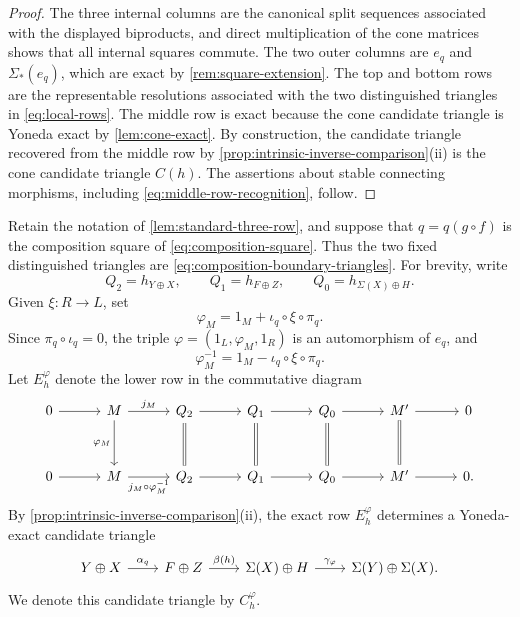 \documentclass[a4paper,11pt,reqno]{amsart}
\theoremstyle{definition}
\theoremstyle{plain}
\numberwithin{equation}{section}
\begin{document}
\begin{proof}
The three internal columns are the canonical split sequences associated with
the displayed biproducts, and direct multiplication of the cone matrices
shows that all internal squares commute.  The two outer columns are
\(e_q\) and \(\Sigma_*(e_q)\), which are exact by
\cref{rem:square-extension}.  The top and bottom rows are the representable
resolutions associated with the two distinguished triangles in
\eqref{eq:local-rows}.  The middle row is exact because the cone candidate triangle is
Yoneda exact by \cref{lem:cone-exact}.  By construction, the candidate triangle recovered from the middle row by
\cref{prop:intrinsic-inverse-comparison}\textup{(ii)} is the cone candidate triangle
\(C(h)\).  The assertions about stable connecting morphisms, including
\eqref{eq:middle-row-recognition}, follow.
\end{proof}

Retain the notation of \cref{lem:standard-three-row}, and suppose that
\(q=q(g\circ f)\) is the composition square of
\eqref{eq:composition-square}.  Thus the two fixed distinguished triangles are
\eqref{eq:composition-boundary-triangles}.  For brevity, write
\[
 Q_2=h_{Y\oplus X},\qquad
 Q_1=h_{F\oplus Z},\qquad
 Q_0=h_{\Sigma(X)\oplus H}.
\]
Given \(\xi:R\to L\), set
\[
 \varphi_M=1_M+\iota_q\circ\xi\circ\pi_q.
\]
Since \(\pi_q\circ\iota_q=0\), the triple
\(\varphi=(1_L,\varphi_M,1_R)\) is an automorphism of \(e_q\), and
\[
 \varphi_M^{-1}=1_M-\iota_q\circ\xi\circ\pi_q.
\]
Let \(E_h^\varphi\) denote the lower row in the commutative diagram
\begin{equation}
\label{eq:middle-row-change}
\begin{tikzcd}[column sep=3em,row sep=3em]
0\arrow[r]&M\arrow[r,"j_M"]\arrow[d,"\varphi_M"']&
Q_2\arrow[r]\arrow[d,equal]&Q_1\arrow[r]\arrow[d,equal]&
Q_0\arrow[r]\arrow[d,equal]&M'\arrow[r]\arrow[d,equal]&0\\
0\arrow[r]&M\arrow[r,"j_M\circ\varphi_M^{-1}"']&
Q_2\arrow[r]&Q_1\arrow[r]&Q_0\arrow[r]&M'\arrow[r]&0.
\end{tikzcd}
\end{equation}
By \cref{prop:intrinsic-inverse-comparison}\textup{(ii)}, the exact row
\(E_h^\varphi\) determines a Yoneda-exact candidate triangle
\begin{equation}
\label{eq:middle-row-candidate}
\begin{tikzcd}[column sep=2.2em]
Y\oplus X\arrow[r,"\alpha_q"]&
F\oplus Z\arrow[r,"\beta(h)"]&
\Sigma(X)\oplus H\arrow[r,"\gamma_\varphi"]&
\Sigma(Y)\oplus\Sigma(X).
\end{tikzcd}
\end{equation}
We denote this candidate triangle by \(C_h^\varphi\).
\end{document}
